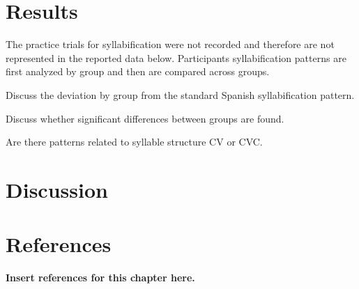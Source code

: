 
\section{Results}

The practice trials for syllabification were not recorded and therefore are not represented in the reported data below. Participants syllabification patterns are first analyzed by group and then are compared across groups. 

Discuss the deviation by group from the standard Spanish syllabification pattern.

Discuss whether significant differences between groups are found.

Are there patterns related to syllable structure CV or CVC.



\section{Discussion}




\section{References}

\textbf{Insert references for this chapter here.}









